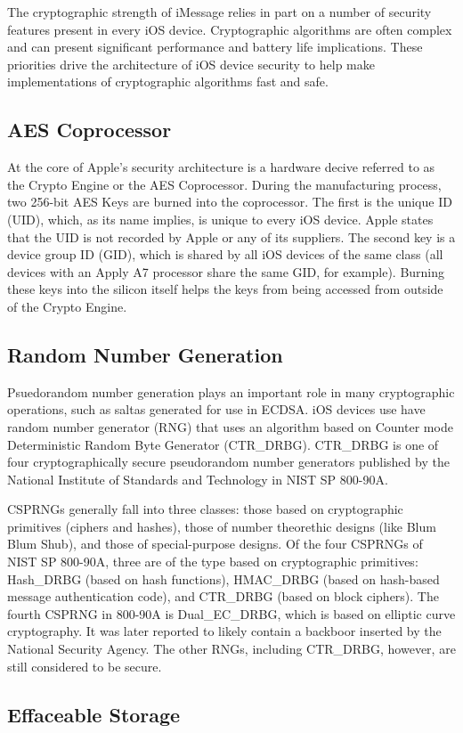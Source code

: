 The cryptographic strength of iMessage relies in part on a number of security
features present in every iOS device. Cryptographic algorithms are often
complex and can present significant performance and battery life implications.
These priorities drive the architecture of iOS device security to help make
implementations of cryptographic algorithms fast and safe.

\subsection{AES Coprocessor}
At the core of Apple's security architecture is a hardware decive referred to
as the Crypto Engine or the AES Coprocessor. During the manufacturing process,
two 256-bit AES Keys are burned into the coprocessor. The first is the unique
ID (UID), which, as its name implies, is unique to every iOS device. Apple
states that the UID is not recorded by Apple or any of its
suppliers\cite{apple}. The second key is a device group ID (GID), which is
shared by all iOS devices of the same class (all devices with an Apply A7
processor share the same GID, for example). Burning these keys into the silicon
itself helps the keys from being accessed from outside of the Crypto Engine.

\subsection{Random Number Generation}
Psuedorandom number generation plays an important role in many cryptographic
operations, such as saltas generated for use in ECDSA. iOS devices use have
random number generator (RNG) that uses an algorithm based on Counter mode
Deterministic Random Byte Generator (CTR\_DRBG).  CTR\_DRBG is one of four
cryptographically secure pseudorandom number generators published by the
National Institute of Standards and Technology in NIST SP
800-90A\cite{nistsp80090a}.

CSPRNGs generally fall into three classes: those based on cryptographic
primitives (ciphers and hashes), those of number theorethic designs (like Blum
Blum Shub), and those of special-purpose designs. Of the four CSPRNGs of NIST
SP 800-90A, three are of the type based on cryptographic primitives: Hash\_DRBG
(based on hash functions), HMAC\_DRBG (based on hash-based message
authentication code), and CTR\_DRBG (based on block ciphers). The fourth CSPRNG
in 800-90A is Dual\_EC\_DRBG, which is based on elliptic curve cryptography. It
was later reported to likely contain a backboor inserted by the National
Security Agency\cite{goodin}. The other RNGs, including CTR\_DRBG, however, are
still considered to be secure.

\subsection{Effaceable Storage}
